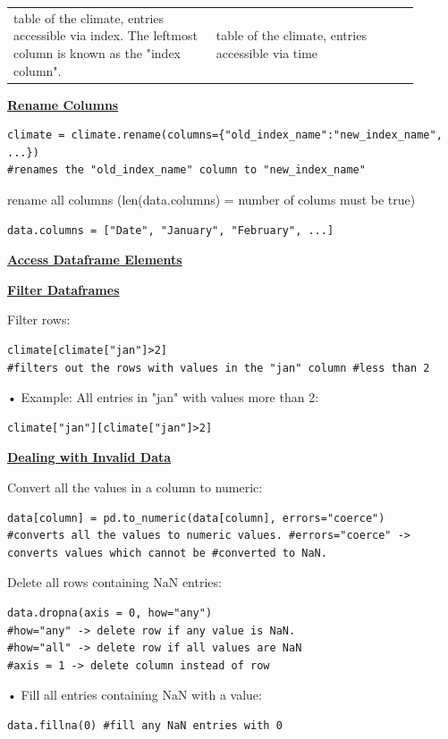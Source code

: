 \begin{tabular*}{\linewidth}{m{0.45\linewidth} | m{0.45\linewidth} |}
    table of the climate, entries accessible via index. The leftmost column is known as the "index column". &  table of the climate, entries accessible via time
\end{tabular*}
 
{\centering\underline{\textbf{Rename Columns}} \par}
\begin{lstlisting}
climate = climate.rename(columns={"old_index_name":"new_index_name", ...})
#renames the "old_index_name" column to "new_index_name"
\end{lstlisting}
rename all columns (len(data.columns) = number of colums must be true)
\begin{lstlisting}
data.columns = ["Date", "January", "February", ...]
\end{lstlisting}

{\centering\underline{\textbf{Access Dataframe Elements}} \par}


{\centering\underline{\textbf{Filter Dataframes}} \par}
Filter rows:
\begin{lstlisting}
climate[climate["jan"]>2]
#filters out the rows with values in the "jan" column #less than 2
\end{lstlisting}
• Example: All entries in "jan" with values more than 2:
\begin{lstlisting}
climate["jan"][climate["jan"]>2]
\end{lstlisting}

{\centering\underline{\textbf{Dealing with Invalid Data}} \par}
Convert all the values in a column to numeric:
\begin{lstlisting}
data[column] = pd.to_numeric(data[column], errors="coerce")
#converts all the values to numeric values. #errors="coerce" -> converts values which cannot be #converted to NaN.
\end{lstlisting}
Delete all rows containing NaN entries:
\begin{lstlisting}
data.dropna(axis = 0, how="any")
#how="any" -> delete row if any value is NaN.
#how="all" -> delete row if all values are NaN
#axis = 1 -> delete column instead of row
\end{lstlisting}
• Fill all entries containing NaN with a value:
\begin{lstlisting}
data.fillna(0) #fill any NaN entries with 0
\end{lstlisting}


